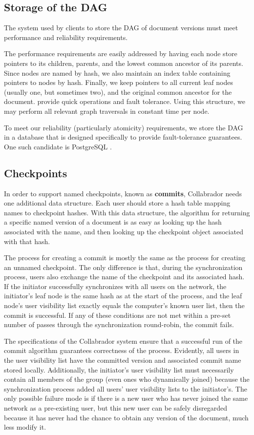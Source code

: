 \documentclass[11pt,titlepage]{article}
\begin{document}
\subsection{Storage of the DAG}

The system used by clients to store the DAG of document versions must
meet performance and reliability requirements.

The performance requirements are easily addressed by having each node
store pointers to its children, parents, and the lowest common
ancestor of its parents.  Since nodes are named by hash, we also
maintain an index table containing pointers to nodes by hash.
Finally, we keep pointers to all current leaf nodes (usually one, but
sometimes two), and the original common ancestor for the document.
provide quick operations and fault tolerance.  Using this structure,
we may perform all relevant graph traversals in constant time per
node.

To meet our reliability (particularly atomicity) requirements, we
store the DAG in a database that is designed specifically to provide
fault-tolerance guarantees.  One such candidate is PostgreSQL
\cite{postgres}.

\subsection{Checkpoints}

In order to support named checkpoints, known as \textbf{commits},
Collabrador needs one additional data structure. Each user should
store a hash table mapping names to checkpoint hashes. With this data
structure, the algorithm for returning a specific named version of a
document is as easy as looking up the hash associated with the name,
and then looking up the checkpoint object associated with that hash.

The process for creating a commit is mostly the same as the process
for creating an unnamed checkpoint. The only difference is that,
during the synchronization process, users also exchange the name of
the checkpoint and its associated hash. If the initiator successfully
synchronizes with all users on the network, the initiator's leaf node
is the same hash as at the start of the process, and the leaf node's
user visibility list exactly equals the computer's known user list,
then the commit is successful. If any of these conditions are not met
within a pre-set number of passes through the synchronization
round-robin, the commit fails.

The specifications of the Collabrador system ensure that a successful
run of the commit algorithm guarantees correctness of the
process. Evidently, all users in the user visibility list have the
committed version and associated commit name stored
locally. Additionally, the initiator's user visibility list must
necessarily contain all members of the group (even ones who
dynamically joined) because the synchronization process added all
users' user visibility lists to the initiator's. The only possible
failure mode is if there is a new user who has never joined the same
network as a pre-existing user, but this new user can be safely
disregarded because it has never had the chance to obtain any version
of the document, much less modify it.
\end{document}
